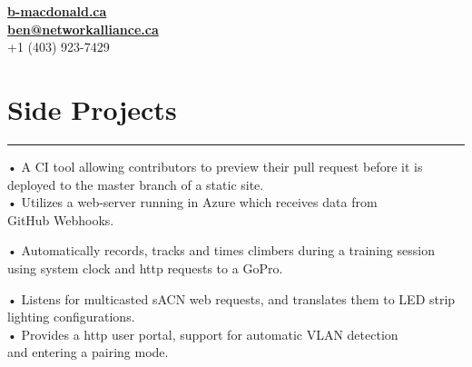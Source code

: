 \documentclass[]{resume}
\begin{document}
\begin{minipage}[t]{0.66\textwidth} 
\descript{}
\hspace*{0pt}\hfill    \\
\hspace*{0pt}\hfill    \\

\hspace*{0pt}\hfill \textbf{\href{https://b-macdonald.ca}{b-macdonald.ca}} \\
\hspace*{0pt}\hfill \textbf{\href{mailto:ben@networkalliance.ca}{ben@networkalliance.ca}} \\
\hspace*{0pt}\hfill +1 (403) 923-7429 \\

\section{Side Projects}
\noindent\rule{12.5cm}{0.4pt}
\noindent
\hspace{3em}%
\begin{minipage}{0.85\textwidth\vspace{5pt}}
• A CI tool allowing contributors to preview their pull request before it is deployed to the master branch of a static site.\\
• Utilizes a web-server running in Azure which receives data from\\GitHub Webhooks.
\end{minipage}
\noindent
\hspace{3em}%
\begin{minipage}{0.85\textwidth\vspace{5pt}}
• Automatically records, tracks and times climbers during a training session using system clock and http requests to a GoPro.
\end{minipage}
\noindent
\hspace{3em}%
\begin{minipage}{0.85\textwidth\vspace{5pt}}
• Listens for multicasted sACN web requests, and translates them to LED strip lighting configurations.\\
• Provides a http user portal, support for automatic VLAN detection\\and entering a pairing mode.
\end{minipage}

\end{minipage}
\end{document}

